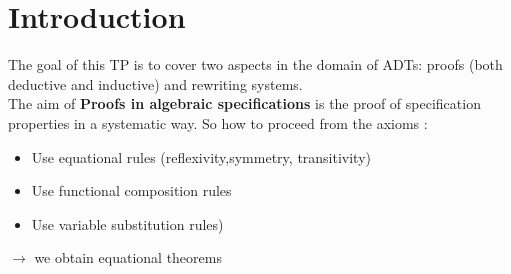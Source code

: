 \section{Introduction}

The goal of this TP is to cover two aspects in the domain of ADTs: proofs (both deductive and inductive) and rewriting systems.\\
The aim of \textbf{Proofs in algebraic specifications} is the proof of specification properties in a systematic way. So how to
proceed from the axioms :\\
\begin{itemize}
\item Use equational rules (reflexivity,symmetry, transitivity)
\item Use functional composition rules
\item Use variable substitution rules) 
\end{itemize}
\hfil ${\rightarrow}$ we obtain equational theorems


